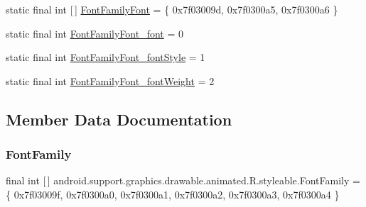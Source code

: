 \begin{DoxyCompactItemize}
\item 
static final int \mbox{[}$\,$\mbox{]} \mbox{\hyperlink{classandroid_1_1support_1_1graphics_1_1drawable_1_1animated_1_1R_1_1styleable_a08ce118a05b234b4bce3be83d4baa78f}{Font\+Family\+Font}} = \{ 0x7f03009d, 0x7f0300a5, 0x7f0300a6 \}
\item 
static final int \mbox{\hyperlink{classandroid_1_1support_1_1graphics_1_1drawable_1_1animated_1_1R_1_1styleable_a74b0523de105a9fc3d47d94313aa161c}{Font\+Family\+Font\+\_\+font}} = 0
\item 
static final int \mbox{\hyperlink{classandroid_1_1support_1_1graphics_1_1drawable_1_1animated_1_1R_1_1styleable_a638b775651df13e5da3be65e17051488}{Font\+Family\+Font\+\_\+font\+Style}} = 1
\item 
static final int \mbox{\hyperlink{classandroid_1_1support_1_1graphics_1_1drawable_1_1animated_1_1R_1_1styleable_a48249eba6fdf1b4b5c0745b92e201681}{Font\+Family\+Font\+\_\+font\+Weight}} = 2
\end{DoxyCompactItemize}


\subsection{Member Data Documentation}
\mbox{\label{classandroid_1_1support_1_1graphics_1_1drawable_1_1animated_1_1R_1_1styleable_a1f2454ad7d6b6aa9d74c5b9ee6507f41}} 
\subsubsection{\texorpdfstring{Font\+Family}{FontFamily}}
{\footnotesize\ttfamily final int \mbox{[}$\,$\mbox{]} android.\+support.\+graphics.\+drawable.\+animated.\+R.\+styleable.\+Font\+Family = \{ 0x7f03009f, 0x7f0300a0, 0x7f0300a1, 0x7f0300a2, 0x7f0300a3, 0x7f0300a4 \}\hspace{0.3cm}{\ttfamily [static]}}

\mbox{\label{classandroid_1_1support_1_1graphics_1_1drawable_1_1animated_1_1R_1_1styleable_a8f6f7c2091c3f4760f5ddaf8647de3ab}} 
